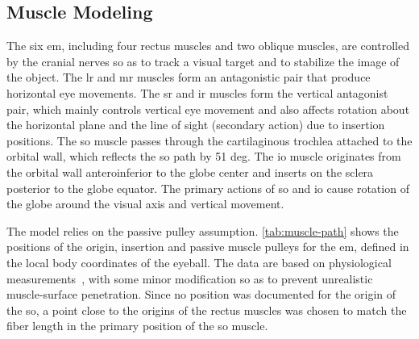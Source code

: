 \documentclass[11pt,a4paper,draft=false]{report}
\begin{document}
\subsection*{Muscle Modeling}\label{sec:muscle-modeling}

The six \gls{em}, including four rectus muscles and two oblique muscles, are
controlled by the cranial nerves so as to track a visual target and to stabilize
the image of the object. The \gls{lr} and \gls{mr} muscles form an antagonistic
pair that produce horizontal eye movements. The \gls{sr} and \gls{ir} muscles
form the vertical antagonist pair, which mainly controls vertical eye movement
and also affects rotation about the horizontal plane and the line of sight
(secondary action) due to insertion positions. The \gls{so} muscle passes
through the cartilaginous trochlea attached to the orbital wall, which reflects
the \gls{so} path by 51 deg. The \gls{io} muscle originates from the orbital
wall anteroinferior to the globe center and inserts on the sclera posterior to
the globe equator. The primary actions of \gls{so} and \gls{io} cause rotation
of the globe around the visual axis and vertical movement.

The model relies on the passive pulley assumption. \autoref{tab:muscle-path}
shows the positions of the origin, insertion and passive muscle pulleys for the
\gls{em}, defined in the local body coordinates of the eyeball. The data are
based on physiological measurements~\cite{Iskander2018}, with some minor
modification so as to prevent unrealistic muscle-surface penetration. Since no
position was documented for the origin of the \gls{so}, a point close to the
origins of the rectus muscles was chosen to match the fiber length in the
primary position of the \gls{so} muscle.
\end{document}
